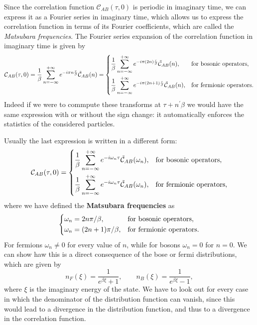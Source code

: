 Since the correlation function \(\mathcal{C}_{AB}(\tau, 0)\) is periodic in imaginary time, we can express it as a Fourier series in imaginary time, which allows us to express the correlation function in terms of its Fourier coefficients, which are called the \textit{Matsubara frequencies}. The Fourier series expansion of the correlation function in imaginary time is given by
\[
    \mathcal{C}_{AB}(\tau, 0) = \frac{1}{\beta} \sum_{n=-\infty}^{+\infty} e^{-i \pi n \frac{\tau}{\beta}} \tilde{\mathcal{C}}_{AB}(n) = \begin{dcases}
        \frac{1}{\beta} \sum_{n=-\infty}^{+\infty} e^{-i \pi (2n) \frac{\tau}{\beta}} \tilde{\mathcal{C}}_{AB}(n),   & \text{for bosonic operators},   \\
        \frac{1}{\beta} \sum_{n=-\infty}^{+\infty} e^{-i \pi (2n+1) \frac{\tau}{\beta}} \tilde{\mathcal{C}}_{AB}(n), & \text{for fermionic operators}.
    \end{dcases}
\]
Indeed if we were to commpute these transforms at \(\tau + n^{\prime} \beta\) we would have the same expression with or without the sign change: it automatically enforces the statistics of the considered particles.

Usually the last expression is written in a different form:
\[
    \mathcal{C}_{AB}(\tau, 0) = \begin{dcases}
        \frac{1}{\beta} \sum_{n=-\infty}^{+\infty} e^{-i \omega_n \tau} \tilde{\mathcal{C}}_{AB}(\omega_n), & \text{for bosonic operators},   \\
        \frac{1}{\beta} \sum_{n=-\infty}^{+\infty} e^{-i \omega_n \tau} \tilde{\mathcal{C}}_{AB}(\omega_n), & \text{for fermionic operators},
    \end{dcases}
\]
where we have defined the \textbf{Matsubara frequencies} as
\[
    \begin{dcases}
        \omega_n = 2n \pi / \beta,       & \text{for bosonic operators},   \\
        \omega_n = (2n + 1) \pi / \beta, & \text{for fermionic operators}.
    \end{dcases}
\]
For fermions \(\omega_n \neq 0\) for every value of \(n\), while for bosons \(\omega_n = 0\) for \(n=0\). We can show haw this is a direct consequence of the bose or fermi distributions, which are given by
\[
    n_F(\xi) = \frac{1}{e^{\beta \xi} + 1}, \qquad n_B(\xi) = \frac{1}{e^{\beta \xi} - 1},
\]
where \(\xi\) is the imaginary energy of the state. We have to look out for every case in which the denominator of the distribution function can vanish, since this would lead to a divergence in the distribution function, and thus to a divergence in the correlation function.


